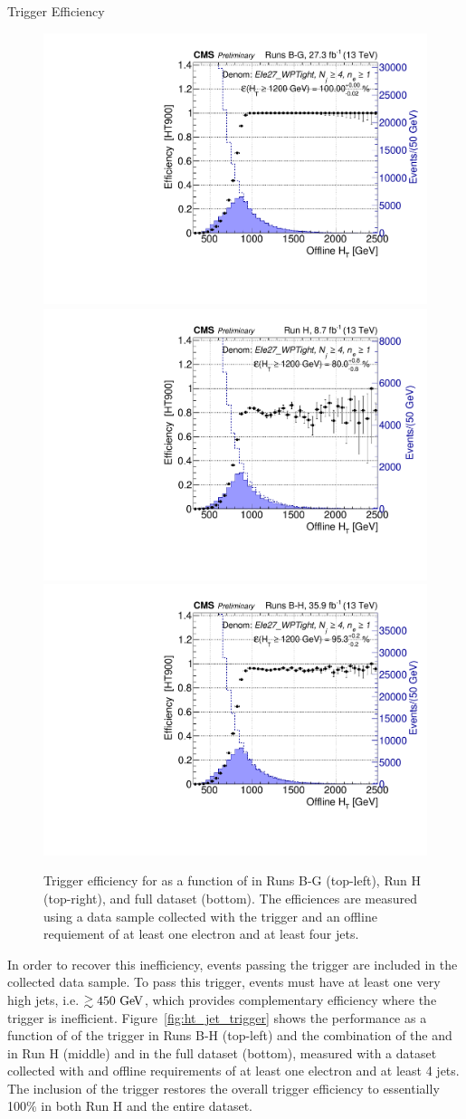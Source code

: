 \begin{section}{Trigger Efficiency}
\begin{figure}[tbp!]
\centering
\includegraphics[angle=0,width=0.45\columnwidth]{fig/trig_ht_runsbg.pdf}
\includegraphics[angle=0,width=0.45\columnwidth]{fig/trig_ht_runh.pdf}
\includegraphics[angle=0,width=0.45\columnwidth]{fig/trig_ht_runsbh.pdf}
\caption{Trigger efficiency for \trigHT as a function of \HT in Runs B-G (top-left), Run H (top-right), and full dataset (bottom). 
The efficiences are measured using a data sample collected with the \trigEle trigger and an offline requiement of at least one electron and at least four jets.}
\label{fig:ht_trigger}
\end{figure}

In order to recover this inefficiency, events passing the \trigJet trigger are included in the collected data sample.
To pass this trigger, events must have at least one very high \pT jets, i.e. $\gtrsim 450~\mathrm{Ge\kern -0.1em V}$, which provides complementary efficiency where the \trigHT trigger is inefficient.
Figure~\ref{fig:ht_jet_trigger} shows the performance as a function of \HT of the \trigJet trigger in Runs B-H (top-left) and the combination of the \trigHT and \trigJet in Run H (middle) and in the full dataset (bottom), measured with a dataset collected with \trigEle and offline requirements of at least one electron and at least 4 jets.
The inclusion of the \trigJet trigger restores the overall trigger efficiency to essentially 100\% in both Run H and the entire dataset.


\end{section}
